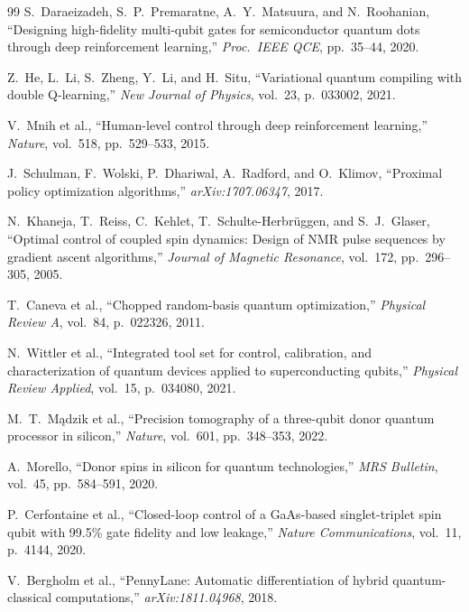 \documentclass[journal]{IEEEtran}
\begin{document}
\begin{thebibliography}{99}
S.~Daraeizadeh, S.~P.~Premaratne, A.~Y.~Matsuura, and N.~Roohanian,
``Designing high-fidelity multi-qubit gates for semiconductor quantum dots
through deep reinforcement learning,''
\textit{Proc.\ IEEE QCE}, pp.~35--44, 2020.

Z.~He, L.~Li, S.~Zheng, Y.~Li, and H.~Situ,
``Variational quantum compiling with double Q-learning,''
\textit{New Journal of Physics}, vol.~23, p.~033002, 2021.

V.~Mnih et al.,
``Human-level control through deep reinforcement learning,''
\textit{Nature}, vol.~518, pp.~529--533, 2015.

J.~Schulman, F.~Wolski, P.~Dhariwal, A.~Radford, and O.~Klimov,
``Proximal policy optimization algorithms,''
\textit{arXiv:1707.06347}, 2017.

N.~Khaneja, T.~Reiss, C.~Kehlet, T.~Schulte-Herbr\"{u}ggen, and S.~J.~Glaser,
``Optimal control of coupled spin dynamics: Design of NMR pulse sequences
by gradient ascent algorithms,''
\textit{Journal of Magnetic Resonance}, vol.~172, pp.~296--305, 2005.

T.~Caneva et al.,
``Chopped random-basis quantum optimization,''
\textit{Physical Review A}, vol.~84, p.~022326, 2011.

N.~Wittler et al.,
``Integrated tool set for control, calibration, and characterization of
quantum devices applied to superconducting qubits,''
\textit{Physical Review Applied}, vol.~15, p.~034080, 2021.

M.~T.~M\k{a}dzik et al.,
``Precision tomography of a three-qubit donor quantum processor in silicon,''
\textit{Nature}, vol.~601, pp.~348--353, 2022.

A.~Morello,
``Donor spins in silicon for quantum technologies,''
\textit{MRS Bulletin}, vol.~45, pp.~584--591, 2020.

P.~Cerfontaine et al.,
``Closed-loop control of a GaAs-based singlet-triplet spin qubit
with 99.5\% gate fidelity and low leakage,''
\textit{Nature Communications}, vol.~11, p.~4144, 2020.

V.~Bergholm et al.,
``PennyLane: Automatic differentiation of hybrid quantum-classical
computations,''
\textit{arXiv:1811.04968}, 2018.


\end{thebibliography}
\end{document}
